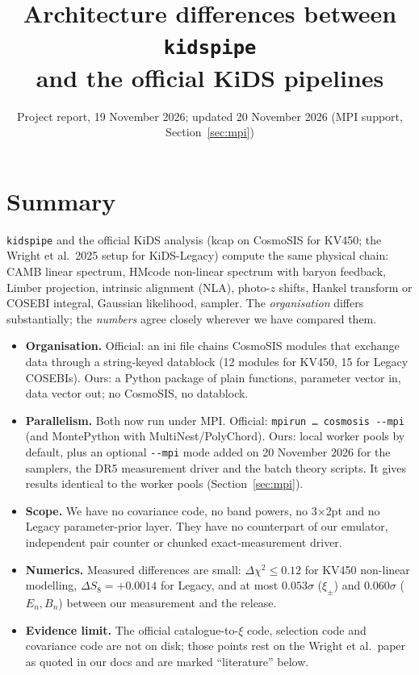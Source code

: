 \documentclass[10pt,a4paper]{article}
\title{\vspace{-1cm}\textbf{Architecture differences between \texttt{kidspipe}\\and the official KiDS pipelines}}
\author{Project report, 19 November 2026; updated 20 November 2026 (MPI support, Section~\ref{sec:mpi})}
\date{}
\begin{document}
\maketitle
\vspace{-1.2cm}

\section{Summary}
\texttt{kidspipe} and the official KiDS analysis (kcap on CosmoSIS for KV450; the Wright et al.\ 2025 setup for KiDS-Legacy) compute the same physical chain: CAMB linear spectrum, HMcode non-linear spectrum with baryon feedback, Limber projection, intrinsic alignment (NLA), photo-$z$ shifts, Hankel transform or COSEBI integral, Gaussian likelihood, sampler. The \emph{organisation} differs substantially; the \emph{numbers} agree closely wherever we have compared them.

\begin{itemize}
\item \textbf{Organisation.} Official: an ini file chains CosmoSIS modules that exchange data through a string-keyed datablock (12 modules for KV450, 15 for Legacy COSEBIs). Ours: a Python package of plain functions, parameter vector in, data vector out; no CosmoSIS, no datablock.
\item \textbf{Parallelism.} Both now run under MPI. Official: \texttt{mpirun \dots\ cosmosis -{}-mpi} (and MontePython with MultiNest/PolyChord). Ours: local worker pools by default, plus an optional \texttt{-{}-mpi} mode added on 20 November 2026 for the samplers, the DR5 measurement driver and the batch theory scripts. It gives results identical to the worker pools (Section~\ref{sec:mpi}).
\item \textbf{Scope.} We have no covariance code, no band powers, no 3$\times$2pt and no Legacy parameter-prior layer. They have no counterpart of our emulator, independent pair counter or chunked exact-measurement driver.
\item \textbf{Numerics.} Measured differences are small: $\Delta\chi^2\le0.12$ for KV450 non-linear modelling, $\Delta S_8=+0.0014$ for Legacy, and at most $0.053\sigma$ ($\xi_\pm$) and $0.060\sigma$ ($E_n,B_n$) between our measurement and the release.
\item \textbf{Evidence limit.} The official catalogue-to-$\xi$ code, selection code and covariance code are not on disk; those points rest on the Wright et al.\ paper as quoted in our docs and are marked ``literature'' below.
\end{itemize}
\end{document}
